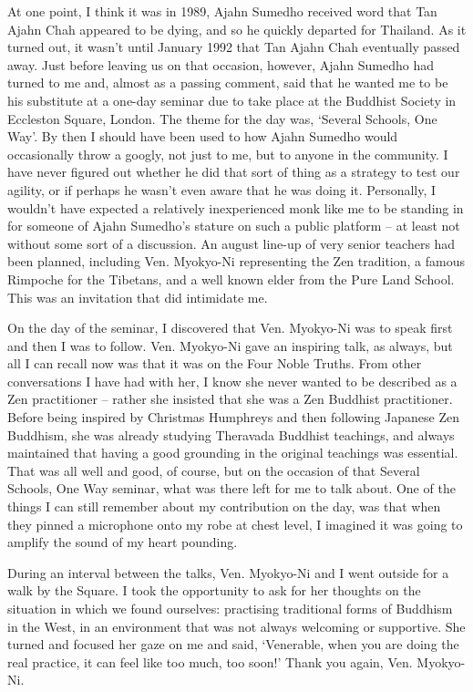 At one point, I think it was in 1989, Ajahn Sumedho received word that
Tan Ajahn Chah appeared to be dying, and so he quickly departed for
Thailand. As it turned out, it wasn't until January 1992 that Tan Ajahn
Chah eventually passed away. Just before leaving us on that occasion,
however, Ajahn Sumedho had turned to me and, almost as a passing
comment, said that he wanted me to be his substitute at a one-day
seminar due to take place at the Buddhist Society in Eccleston Square,
London. The theme for the day was, `Several Schools, One Way'. By then I
should have been used to how Ajahn Sumedho would occasionally throw a
googly, not just to me, but to anyone in the community. I have never
figured out whether he did that sort of thing as a strategy to test our
agility, or if perhaps he wasn't even aware that he was doing it.
Personally, I wouldn't have expected a relatively inexperienced monk
like me to be standing in for someone of Ajahn Sumedho's stature on such
a public platform -- at least not without some sort of a discussion. An
august line-up of very senior teachers had been planned, including Ven.
Myokyo-Ni representing the Zen tradition, a famous Rimpoche for the
Tibetans, and a well known elder from the Pure Land School. This was an
invitation that did intimidate me.

On the day of the seminar, I discovered that Ven. Myokyo-Ni was to speak
first and then I was to follow. Ven. Myokyo-Ni gave an inspiring talk,
as always, but all I can recall now was that it was on the Four Noble
Truths. From other conversations I have had with her, I know she never
wanted to be described as a Zen practitioner -- rather she insisted that
she was a Zen Buddhist practitioner. Before being inspired by Christmas
Humphreys and then following Japanese Zen Buddhism, she was already studying
Theravada Buddhist teachings, and always maintained that having a good
grounding in the original teachings was essential. That was all well and
good, of course, but on the occasion of that Several Schools, One Way
seminar, what was there left for me to talk about. One of the things I can still remember about my contribution on the day, was that when they pinned
a microphone onto my robe at chest level, I imagined it was going to
amplify the sound of my heart pounding.

During an interval between the talks, Ven. Myokyo-Ni and I went outside for
a walk by the Square. I took the opportunity to ask for her thoughts on
the situation in which we found ourselves: practising traditional forms
of Buddhism in the West, in an environment that was not always welcoming
or supportive. She turned and focused her gaze on me
and said, `Venerable, when you are doing the real practice, it can
feel like too much, too soon!' Thank you again, Ven. Myokyo-Ni.

